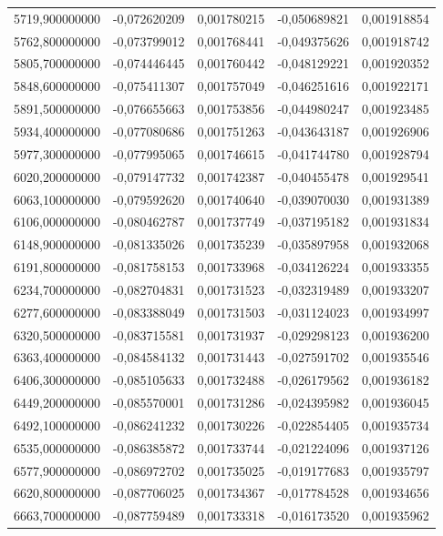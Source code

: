 \begin{longtable}{rrrrr}
5719,900000000 & -0,072620209 & 0,001780215 & -0,050689821 & 0,001918854\\
5762,800000000 & -0,073799012 & 0,001768441 & -0,049375626 & 0,001918742\\
5805,700000000 & -0,074446445 & 0,001760442 & -0,048129221 & 0,001920352\\
5848,600000000 & -0,075411307 & 0,001757049 & -0,046251616 & 0,001922171\\
5891,500000000 & -0,076655663 & 0,001753856 & -0,044980247 & 0,001923485\\
5934,400000000 & -0,077080686 & 0,001751263 & -0,043643187 & 0,001926906\\
5977,300000000 & -0,077995065 & 0,001746615 & -0,041744780 & 0,001928794\\
6020,200000000 & -0,079147732 & 0,001742387 & -0,040455478 & 0,001929541\\
6063,100000000 & -0,079592620 & 0,001740640 & -0,039070030 & 0,001931389\\
6106,000000000 & -0,080462787 & 0,001737749 & -0,037195182 & 0,001931834\\
6148,900000000 & -0,081335026 & 0,001735239 & -0,035897958 & 0,001932068\\
6191,800000000 & -0,081758153 & 0,001733968 & -0,034126224 & 0,001933355\\
6234,700000000 & -0,082704831 & 0,001731523 & -0,032319489 & 0,001933207\\
6277,600000000 & -0,083388049 & 0,001731503 & -0,031124023 & 0,001934997\\
6320,500000000 & -0,083715581 & 0,001731937 & -0,029298123 & 0,001936200\\
6363,400000000 & -0,084584132 & 0,001731443 & -0,027591702 & 0,001935546\\
6406,300000000 & -0,085105633 & 0,001732488 & -0,026179562 & 0,001936182\\
6449,200000000 & -0,085570001 & 0,001731286 & -0,024395982 & 0,001936045\\
6492,100000000 & -0,086241232 & 0,001730226 & -0,022854405 & 0,001935734\\
6535,000000000 & -0,086385872 & 0,001733744 & -0,021224096 & 0,001937126\\
6577,900000000 & -0,086972702 & 0,001735025 & -0,019177683 & 0,001935797\\
6620,800000000 & -0,087706025 & 0,001734367 & -0,017784528 & 0,001934656\\
6663,700000000 & -0,087759489 & 0,001733318 & -0,016173520 & 0,001935962\\

\end{longtable}
